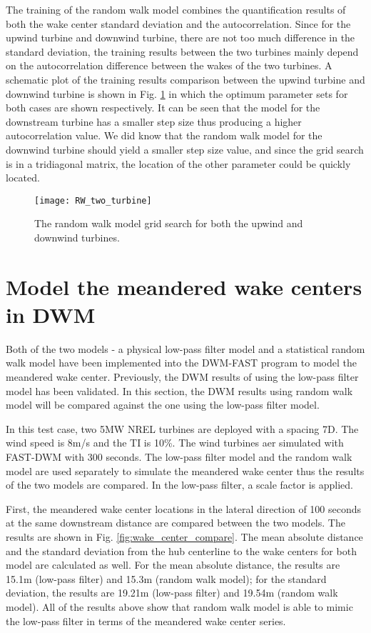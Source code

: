 \documentclass{umthesis}
\begin{document}
The training of the random walk model combines the quantification results of both the wake center standard deviation and the autocorrelation. Since for the upwind turbine and downwind turbine, there are not too much difference in the standard deviation, the training results between the two turbines mainly depend on the autocorrelation difference between the wakes of the two turbines. A schematic plot of the training results comparison between the upwind turbine and downwind turbine is shown in Fig. \ref{fig:rw_two_turbine} in which the optimum parameter sets for both cases are shown respectively. It can be seen that the model for the downstream turbine has a smaller step size thus producing a higher autocorrelation value. We did know that the random walk model for the downwind turbine should yield a smaller step size value, and since the grid search is in a tridiagonal matrix, the location of the other parameter could be quickly located. 

\begin{figure}
  \centering
  \texttt{[image: RW\_two\_turbine]}
  \caption{The random walk model grid search for both the upwind and downwind turbines.}\label{fig:rw_two_turbine}
\end{figure}

\section{Model the meandered wake centers in DWM}\label{sec:RW_detail}
Both of the two models - a physical low-pass filter model and a statistical random walk model have been implemented into the DWM-FAST program to model the meandered wake center. Previously, the DWM results of using the low-pass filter model has been validated. In this section, the DWM results using random walk model will be compared against the one using the low-pass filter model.

In this test case, two 5MW NREL turbines are deployed with a spacing 7D. The wind speed is 8m/s and the TI is 10\%. The wind turbines aer simulated with FAST-DWM with 300 seconds. The low-pass filter model and the random walk model are used separately to simulate the meandered wake center thus the results of the two models are compared. In the low-pass filter, a scale factor is applied.

First, the meandered wake center locations in the lateral direction of 100 seconds at the same downstream distance are compared between the two models. The results are shown in Fig. \ref{fig:wake_center_compare}. The mean absolute distance and the standard deviation from the hub centerline to the wake centers for both model are calculated as well. For the mean absolute distance, the results are 15.1m (low-pass filter) and 15.3m (random walk model); for the standard deviation, the results are 19.21m (low-pass filter) and 19.54m (random walk model). All of the results above show that random walk model is able to mimic the low-pass filter in terms of the meandered wake center series.   
\end{document}
